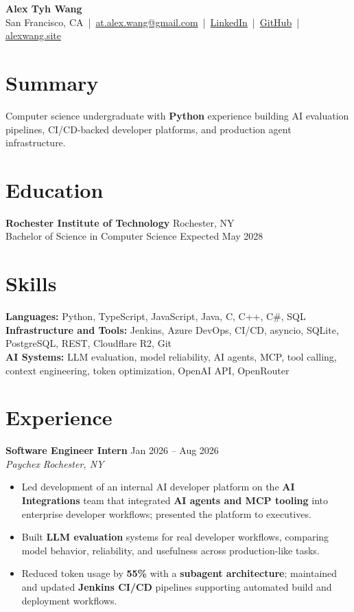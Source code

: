 \documentclass[10pt,letterpaper]{article}
\newif\ifresumeFirstRole
\newcommand{\resumeRole}[4]{%
  \ifresumeFirstRole
    \global\resumeFirstRolefalse
  \else
    \vspace{0pt plus 1fill}%
  \fi
  \textbf{#1} \hfill #2\\
  \textit{#3} \hfill \textit{#4}
}
\begin{document}
\begin{center}
{\Large \textbf{Alex Tyh Wang}}\\
San Francisco, CA \,|\, \href{mailto:at.alex.wang@gmail.com}{at.alex.wang@gmail.com} \,|\, \href{https://www.linkedin.com/in/alex-tyh-wang/}{LinkedIn} \,|\, \href{https://github.com/alextyhwang}{GitHub} \,|\, \href{https://alexwang.site}{alexwang.site}
\end{center}

\section*{Summary}
Computer science undergraduate with \textbf{Python} experience building AI evaluation pipelines, CI/CD-backed developer platforms, and production agent infrastructure.

\section*{Education}
\textbf{Rochester Institute of Technology} \hfill Rochester, NY\\
Bachelor of Science in Computer Science \hfill Expected May 2028

\section*{Skills}
\textbf{Languages:} Python, TypeScript, JavaScript, Java, C, C++, C\#, SQL\\
\textbf{Infrastructure and Tools:} Jenkins, Azure DevOps, CI/CD, asyncio, SQLite, PostgreSQL, REST, Cloudflare R2, Git\\
\textbf{AI Systems:} LLM evaluation, model reliability, AI agents, MCP, tool calling, context engineering, token optimization, OpenAI API, OpenRouter

\section*{Experience}
\resumeRole{Software Engineer Intern}{Jan 2026 -- Aug 2026}{Paychex}{Rochester, NY}
\begin{itemize}
  \item Led development of an internal AI developer platform on the \textbf{AI Integrations} team that integrated \textbf{AI agents and MCP tooling} into enterprise developer workflows; presented the platform to executives.
  \item Built \textbf{LLM evaluation} systems for real developer workflows, comparing model behavior, reliability, and usefulness across production-like tasks.
  \item Reduced token usage by \textbf{55\%} with a \textbf{subagent architecture}; maintained and updated \textbf{Jenkins CI/CD} pipelines supporting automated build and deployment workflows.
\end{itemize}
\end{document}
